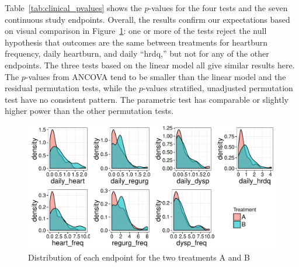 \documentclass[12pt]{article}
\newcommand{\todo}[1]{{\color{red}{TO DO: \sc #1}}}
\begin{document}
Table~\ref{tab:clinical_pvalues} shows the $p$-values for the four tests and the seven continuous study endpoints.
Overall, the results confirm our expectations based on visual comparison in Figure~\ref{fig:clinical_distr}:
one or more of the tests reject the null hypothesis that outcomes are the same between treatments for heartburn frequency, daily heartburn, and daily ``hrdq,''
but not for any of the other endpoints.
The three tests based on the linear model all give similar results here.
The $p$-values from ANCOVA tend to be smaller than the linear model and the residual permutation tests, while the $p$-values stratified, unadjusted permutation test have no consistent pattern.
The parametric test has comparable or slightly higher power than the other permutation tests.

\todo{need a conclusion}

\begin{figure}
\centering
\includegraphics[width = \textwidth]{fig/clinical_distr.pdf}
\caption{Distribution of each endpoint for the two treatments A and B}
\label{fig:clinical_distr}
\end{figure}

%
%
\end{document}
